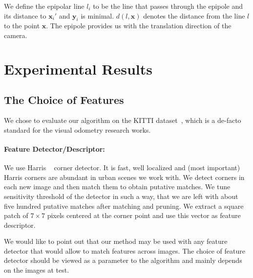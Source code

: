 We define the epipolar line $l_i$ to be the line that passes through
the epipole and its distance to $\mathbf{x}_i'$ and $\mathbf{y}_i$ is
minimal. $d(l,\mathbf{x})$ denotes the distance from the line $l$ to
the point $\mathbf{x}$.  The epipole provides us with the translation
direction of the camera.

\section{Experimental Results}\label{sec:results}

\subsection{The Choice of Features}
We chose to evaluate our algorithm on the KITTI
dataset~\cite{Geiger2012}, which is a de-facto standard for the
visual odometry research works.

\paragraph{Feature Detector/Descriptor:} We use Harris
~\cite{Harris1988} corner detector. It is fast, well localized and
(most important) Harris corners are abundant in urban scenes we work
with. We detect corners in each new image and then match them to
obtain putative matches.  We tune sensitivity threshold of the
detector in such a way, that we are left with about five hundred
putative matches after matching and pruning.  We extract a square
patch of $7\times 7$ pixels centered at the corner point and use this
vector as feature descriptor.

We would like to point out that our method may be used with any
feature detector that would allow to match features across images. The
choice of feature detector should be viewed as a parameter to the
algorithm and mainly depends on the images at test.

